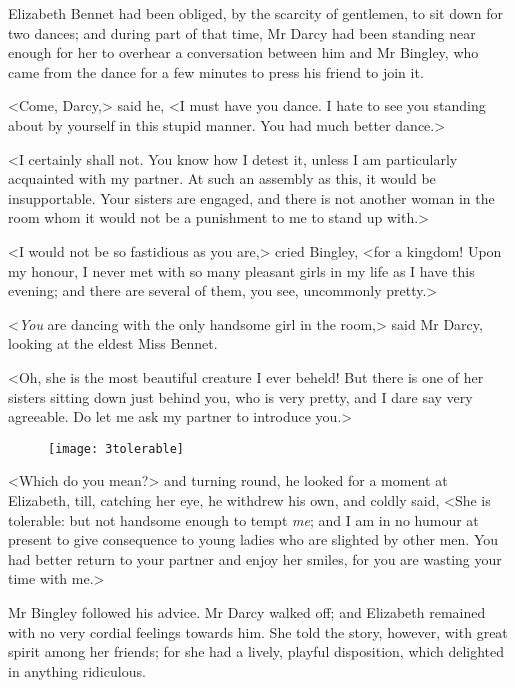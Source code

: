 Elizabeth Bennet had been obliged, by the scarcity of gentlemen, to sit down for two dances; and during part of that time, Mr Darcy had been standing near enough for her to overhear a conversation between him and Mr Bingley, who came from the dance for a few minutes to press his friend to join it.

<Come, Darcy,> said he, <I must have you dance. I hate to see you standing about by yourself in this stupid manner. You had much better dance.>

<I certainly shall not. You know how I detest it, unless I am particularly acquainted with my partner. At such an assembly as this, it would be insupportable. Your sisters are engaged, and there is not another woman in the room whom it would not be a punishment to me to stand up with.>

<I would not be so fastidious as you are,> cried Bingley, <for a kingdom! Upon my honour, I never met with so many pleasant girls in my life as I have this evening; and there are several of them, you see, uncommonly pretty.>

<\textit{You} are dancing with the only handsome girl in the room,> said Mr Darcy, looking at the eldest Miss Bennet.

<Oh, she is the most beautiful creature I ever beheld! But there is one of her sisters sitting down just behind you, who is very pretty, and I dare say very agreeable. Do let me ask my partner to introduce you.>

\begin{figure}[tbh]
\centering
\texttt{[image: 3tolerable]}
\end{figure}

<Which do you mean?> and turning round, he looked for a moment at Elizabeth, till, catching her eye, he withdrew his own, and coldly said, <She is tolerable: but not handsome enough to tempt \textit{me}; and I am in no humour at present to give consequence to young ladies who are slighted by other men. You had better return to your partner and enjoy her smiles, for you are wasting your time with me.>



Mr Bingley followed his advice. Mr Darcy walked off; and Elizabeth remained with no very cordial feelings towards him. She told the story, however, with great spirit among her friends; for she had a lively, playful disposition, which delighted in anything ridiculous.


